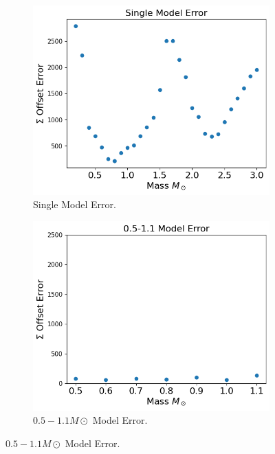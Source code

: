 \begin{figure}[H]
	\centering
	\begin{subfigure}{\textwidth}
		\includegraphics[width=\textwidth,height=0.5\textheight]{assets/singlemodeerror.png}
		\caption{Single Model Error.}
	\end{subfigure}
	\begin{subfigure}{\textwidth}
		\includegraphics[width=\textwidth,height=0.5\textheight]{assets/0.5-1.1Error.png}
		\caption{$0.5-1.1M\odot$ Model Error.}
	\end{subfigure}
	\label{fig:sumerror}
\end{figure}

